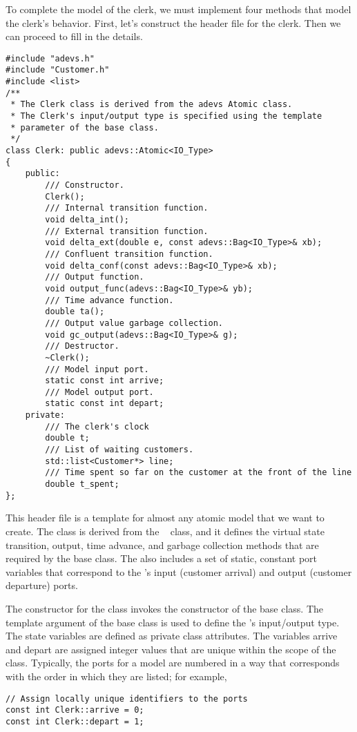 To complete the
model of the clerk, we must implement four methods that model the
clerk's behavior. First, let's construct the header
file for the clerk. Then we can proceed to fill in the details.
\begin{verbatim}
#include "adevs.h"
#include "Customer.h"
#include <list>
/**
 * The Clerk class is derived from the adevs Atomic class.
 * The Clerk's input/output type is specified using the template
 * parameter of the base class.
 */
class Clerk: public adevs::Atomic<IO_Type> 
{
    public:
        /// Constructor.
        Clerk();
        /// Internal transition function.
        void delta_int();
        /// External transition function.
        void delta_ext(double e, const adevs::Bag<IO_Type>& xb);
        /// Confluent transition function.
        void delta_conf(const adevs::Bag<IO_Type>& xb);
        /// Output function.  
        void output_func(adevs::Bag<IO_Type>& yb);
        /// Time advance function.
        double ta();
        /// Output value garbage collection.
        void gc_output(adevs::Bag<IO_Type>& g);
        /// Destructor.
        ~Clerk();
        /// Model input port.
        static const int arrive;
        /// Model output port.
        static const int depart;
    private:
        /// The clerk's clock
        double t;
        /// List of waiting customers.
        std::list<Customer*> line;
        /// Time spent so far on the customer at the front of the line
        double t_spent;
};
\end{verbatim}
This header file is a template for almost any atomic model that
we want to create. The  class is derived from the \adevs\  class,
and it defines the virtual state transition,
output, time advance, and garbage collection methods that are required by the
 base class. The  also includes a set of static, constant
port variables that correspond to the 's input (customer arrival) and
output (customer departure) ports. 

The constructor for the  class invokes
the constructor of the  base class. The template argument of the base
class is used to define the 's input/output type. The  state variables
are defined as private class attributes.
The variables arrive and depart are assigned integer values that are unique within the scope of the  class.
Typically, the ports for a model are numbered in a way
that corresponds with the order in which they are listed; for example, 
\begin{verbatim}
// Assign locally unique identifiers to the ports
const int Clerk::arrive = 0;
const int Clerk::depart = 1;
\end{verbatim}

